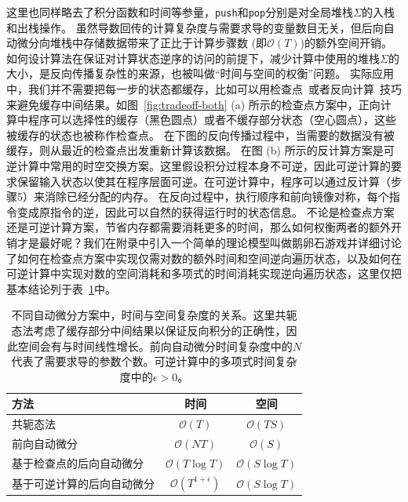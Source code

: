 \documentclass[A4,twoside,UTF8]{ctexart}
\newcommand{\bigO}{{\mathcal{O}}}
\begin{document}
这里也同样略去了积分函数和时间等参量，\texttt{push}和\texttt{pop}分别是对全局堆栈$\Sigma$的入栈和出栈操作。
虽然导数回传的计算复杂度与需要求导的变量数目无关，但后向自动微分向堆栈中存储数据带来了正比于计算步骤数 (即$\bigO(T)$)的额外空间开销。
如何设计算法在保证对计算状态逆序的访问的前提下，减少计算中使用的堆栈$\Sigma$的大小，是反向传播复杂性的来源，也被叫做“时间与空间的权衡”问题。
实际应用中，我们并不需要把每一步的状态都缓存，比如可以用检查点~\cite{Griewank1992}或者反向计算~\cite{Liu2020b}技巧来避免缓存中间结果。如图~\ref{fig:tradeoff-both} (a) 所示的检查点方案中，正向计算中程序可以选择性的缓存（黑色圆点）或者不缓存部分状态（空心圆点），这些被缓存的状态也被称作检查点。
在下图的反向传播过程中，当需要的数据没有被缓存，则从最近的检查点出发重新计算该数据。
在图 (b) 所示的反计算方案是可逆计算中常用的时空交换方案。这里假设积分过程本身不可逆，因此可逆计算的要求保留输入状态以使其在程序层面可逆。在可逆计算中，程序可以通过反计算（步骤5）来消除已经分配的内存。
在反向过程中，执行顺序和前向镜像对称，每个指令变成原指令的逆，因此可以自然的获得运行时的状态信息。
不论是检查点方案还是可逆计算方案，节省内存都需要消耗更多的时间，那么如何权衡两者的额外开销才是最好呢？我们在附录中引入一个简单的理论模型叫做鹅卵石游戏并详细讨论了如何在检查点方案中实现仅需对数的额外时间和空间逆向遍历状态，以及如何在可逆计算中实现对数的空间消耗和多项式的时间消耗实现逆向遍历状态，这里仅把基本结论列于表~\ref{tbl:complexity}中。

\begin{table}\centering
    \begin{tabularx}{0.7\textwidth}{Xcc}\toprule
        \textbf{方法} & 时间 & 空间\\
        \hline
        共轭态法                    &  $\bigO(T)$          & $\bigO(TS)$\\
        前向自动微分                 &  $\bigO(NT)$         & $\bigO(S)$  \\
        基于检查点的后向自动微分     &  $\bigO(T\log T)$    & $\bigO(S\log T)$   \\
        基于可逆计算的后向自动微分   &  $\bigO(T^{1+\epsilon})$ & $\bigO(S\log T)$ \\
        \bottomrule
    \end{tabularx}
    \caption{不同自动微分方案中，时间与空间复杂度的关系。这里共轭态法考虑了缓存部分中间结果以保证反向积分的正确性，因此空间会有与时间线性增长。前向自动微分时间复杂度中的$N$代表了需要求导的参数个数。可逆计算中的多项式时间复杂度中的$\epsilon > 0$。} \label{tbl:complexity}
\end{table}
\end{document}

